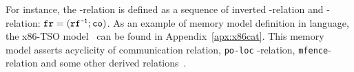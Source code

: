 For instance, the \fr-relation is defined as a sequence of inverted \rf-relation and \co-relation: $\texttt{fr} = (\texttt{rf}^{\texttt{-1}};\texttt{co})$.
As an example of memory model definition in \cat{} language, the x86-TSO model~\cite{herd10tutorial} can be found in Appendix~\ref{apx:x86cat}.
This memory model asserts acyclicity of communication relation, \texttt{po-loc} -relation, \texttt{mfence}-relation and some other derived relations~\cite{owens2009better}.
